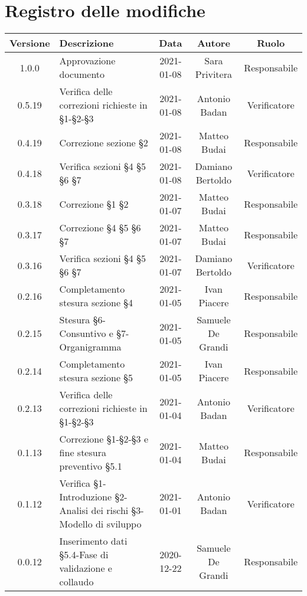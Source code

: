 \section*{Registro delle modifiche}

\begin{center}
	\begin{longtable}{|c|p{5cm}|c|c|c|}
	\hline
	\rowcolor{lighter-grayer}
	\textbf{Versione} & \textbf{Descrizione} & \textbf{Data} & \textbf{Autore} & \textbf{Ruolo} \\
	\hline
	\endfirsthead

	1.0.0 & Approvazione documento & 2021-01-08 & Sara Privitera & Responsabile \\
	\hline
	0.5.19 & Verifica delle correzioni richieste in §1-§2-§3 & 2021-01-08 & Antonio Badan & Verificatore \\
	\hline
	0.4.19 & Correzione sezione §2 & 2021-01-08 & Matteo Budai & Responsabile \\
	\hline
	0.4.18 & Verifica sezioni §4 §5 §6 §7 & 2021-01-08 & Damiano Bertoldo & Verificatore \\
	\hline
	0.3.18 & Correzione §1 §2 & 2021-01-07 & Matteo Budai & Responsabile \\
	\hline
	0.3.17 & Correzione §4 §5 §6 §7 & 2021-01-07 & Matteo Budai & Responsabile \\
	\hline
	0.3.16 & Verifica sezioni §4 §5 §6 §7 & 2021-01-07 & Damiano Bertoldo & Verificatore \\
	\hline
	0.2.16 & Completamento stesura sezione §4 & 2021-01-05 & Ivan Piacere & Responsabile \\
	\hline
	0.2.15 & Stesura §6-Consuntivo e §7-Organigramma & 2021-01-05 & Samuele De Grandi & Responsabile \\
	\hline
	0.2.14 & Completamento stesura sezione §5 & 2021-01-05 & Ivan Piacere & Responsabile \\
	\hline
	0.2.13 & Verifica delle correzioni richieste in §1-§2-§3 & 2021-01-04 & Antonio Badan & Verificatore \\
	\hline
	0.1.13 & Correzione §1-§2-§3 e fine stesura preventivo §5.1 & 2021-01-04 & Matteo Budai & Responsabile \\
	\hline
	0.1.12 & Verifica §1-Introduzione §2-Analisi dei rischi §3-Modello di sviluppo & 2021-01-01 & Antonio Badan & Verificatore \\
	\hline
	0.0.12 & Inserimento dati §5.4-Fase di validazione e collaudo & 2020-12-22 & Samuele De Grandi & Responsabile \\

\end{longtable}
\end{center}
